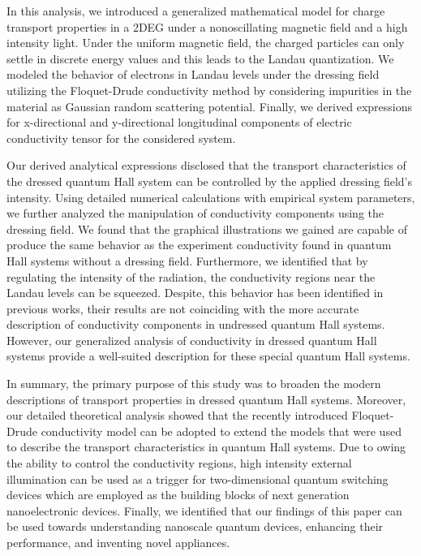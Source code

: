 In this analysis, we introduced a generalized mathematical model for charge transport properties in a 2DEG under a nonoscillating magnetic field and a high intensity light. Under the uniform magnetic field, the charged particles can only settle in discrete energy values and this leads to the Landau quantization. We modeled the behavior of electrons in Landau levels under the dressing field utilizing the Floquet-Drude conductivity method by considering impurities in the material as Gaussian random scattering potential. Finally, we derived expressions for x-directional and y-directional longitudinal components of electric conductivity tensor for the considered system.

Our derived analytical expressions disclosed that the transport characteristics of the dressed quantum Hall system can be controlled by the applied dressing field’s intensity. Using detailed numerical calculations with empirical system parameters, we further analyzed the manipulation of conductivity components using the dressing field. We found that the graphical illustrations we gained are capable of produce the same behavior as the experiment conductivity found in quantum Hall systems without a dressing field. Furthermore, we identified that by regulating the intensity of the radiation, the conductivity regions near the Landau levels can be squeezed. Despite, this behavior has been identified in previous works, their results are not coinciding with the more accurate description of conductivity components in undressed quantum Hall systems. However, our generalized analysis of conductivity in dressed quantum Hall systems provide a well-suited description for these special quantum Hall systems.

In summary, the primary purpose of this study was to broaden the modern descriptions of transport properties in dressed quantum Hall systems. Moreover, our detailed theoretical analysis showed that the recently introduced Floquet-Drude conductivity model can be adopted to extend the models that were used to describe the transport characteristics in quantum Hall systems. Due to owing the ability to control the conductivity regions, high intensity external illumination can be used as a trigger for two-dimensional quantum switching devices which are employed as the building blocks of next generation nanoelectronic devices. Finally, we identified that our findings of this paper can be used towards understanding nanoscale quantum devices, enhancing their performance, and inventing novel appliances.
